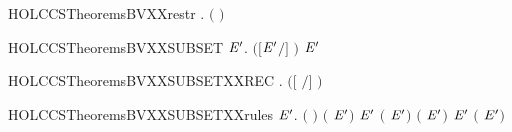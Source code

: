 \newcommand{\HOLCCSTheoremsBVXXrelab}{\UseVerbatim{HOLCCSTheoremsBVXXrelab}}
\begin{SaveVerbatim}{HOLCCSTheoremsBVXXrestr}
\HOLTokenTurnstile{} \HOLSymConst{\HOLTokenForall{}} .  \ensuremath{(}  \ensuremath{)} \HOLSymConst{\ensuremath{=}}  
\end{SaveVerbatim}
\newcommand{\HOLCCSTheoremsBVXXrestr}{\UseVerbatim{HOLCCSTheoremsBVXXrestr}}
\begin{SaveVerbatim}{HOLCCSTheoremsBVXXSUBSET}
\HOLTokenTurnstile{} \HOLSymConst{\HOLTokenForall{}}  \ensuremath{\HOLBoundVar{E}\sp{\prime{}}}.  \ensuremath{(}\ensuremath{[}\ensuremath{\HOLBoundVar{E}\sp{\prime{}}}\ensuremath{/}\ensuremath{]} \ensuremath{)} \HOLConst{\HOLTokenSubset{}}   \HOLConst{\HOLTokenUnion{}}  \ensuremath{\HOLBoundVar{E}\sp{\prime{}}}
\end{SaveVerbatim}
\newcommand{\HOLCCSTheoremsBVXXSUBSET}{\UseVerbatim{HOLCCSTheoremsBVXXSUBSET}}
\begin{SaveVerbatim}{HOLCCSTheoremsBVXXSUBSETXXREC}
\HOLTokenTurnstile{} \HOLSymConst{\HOLTokenForall{}} .  \ensuremath{(}\ensuremath{[}  \ensuremath{/}\ensuremath{]} \ensuremath{)} \HOLConst{\HOLTokenSubset{}}    
\end{SaveVerbatim}
\newcommand{\HOLCCSTheoremsBVXXSUBSETXXREC}{\UseVerbatim{HOLCCSTheoremsBVXXSUBSETXXREC}}
\begin{SaveVerbatim}{HOLCCSTheoremsBVXXSUBSETXXrules}
\HOLTokenTurnstile{} \HOLSymConst{\HOLTokenForall{}}  \ensuremath{\HOLBoundVar{E}\sp{\prime{}}}.
       \HOLConst{\HOLTokenSubset{}}  \ensuremath{(}  \ensuremath{)} \HOLSymConst{\HOLTokenConj{}}   \HOLConst{\HOLTokenSubset{}}  \ensuremath{(} \HOLSymConst{\ensuremath{+}} \ensuremath{\HOLBoundVar{E}\sp{\prime{}}}\ensuremath{)} \HOLSymConst{\HOLTokenConj{}}
      \ensuremath{\HOLBoundVar{E}\sp{\prime{}}} \HOLConst{\HOLTokenSubset{}}  \ensuremath{(} \HOLSymConst{\ensuremath{+}} \ensuremath{\HOLBoundVar{E}\sp{\prime{}}}\ensuremath{)} \HOLSymConst{\HOLTokenConj{}}   \HOLConst{\HOLTokenSubset{}}  \ensuremath{(} \HOLSymConst{\ensuremath{\mid}} \ensuremath{\HOLBoundVar{E}\sp{\prime{}}}\ensuremath{)} \HOLSymConst{\HOLTokenConj{}}
      \ensuremath{\HOLBoundVar{E}\sp{\prime{}}} \HOLConst{\HOLTokenSubset{}}  \ensuremath{(} \HOLSymConst{\ensuremath{\mid}} \ensuremath{\HOLBoundVar{E}\sp{\prime{}}}\ensuremath{)}
\end{SaveVerbatim}
